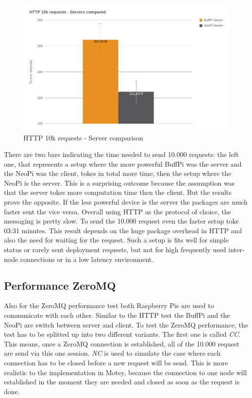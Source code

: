 \begin{figure}[H]
    \centering
    \includegraphics[width=\textwidth]{resources/images/performance_http_server_comparison.png}
    \caption[HTTP 10k requests - Server comparison]{HTTP 10k requests - Server comparison}
    \label{fig:performance_http_server_comparison}
\end{figure}

There are two bars indicating the time needed to send 10.000 requests: the left one, that represents a setup where the more powerful BuffPi was the server and the NeoPi was the client, tokes in total more time, then the setup where the NeoPi is the server.
This is a surprising outcome because the assumption was that the server tokes more computation time then the client.
But the results prove the opposite.
If the less powerful device is the server the packages are much faster sent the vice versa.
Overall using \ac{HTTP} as the protocol of choice, the messaging is pretty slow.
To send the 10.000 request even the faster setup toke 03:31 minutes.
This result depends on the huge package overhead in \ac{HTTP} and also the need for waiting for the request.
Such a setup is fits well for simple status or rarely sent deployment requests, but not for high frequently used inter-node connections or in a low latency environment.

\subsection{Performance ZeroMQ}
Also for the ZeroMQ performance test both Raspberry Pis are used to communicate with each other.
Similar to the \ac{HTTP} test the BuffPi and the NeoPi are switch between server and client.
To test the ZeroMQ performance, the test has to be splitted up into two different variants.
The first one is called \textit{\ac{CC}}.
This means, once a ZeroMQ connection is established, all of the 10.000 request are send via this one session.
\textit{\ac{NC}} is used to simulate the case where each connection has to be closed before a new request will be send.
This is more realistic to the implementation in Motey, because the connection to one node will established in the moment they are needed and closed as soon as the request is done.\newline


